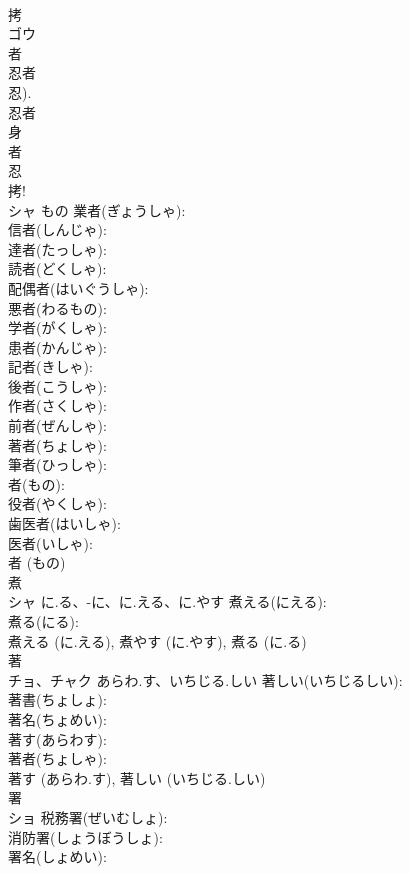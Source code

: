 \documentclass[8pt]{extreport}
\begin{document}
\begin{CJK}{UTF8}{min}
\\	拷			
\\	ゴウ			
\\	者			
\\	忍者 
\\	忍). 
\\	忍者 
\\	身 
\\	者 
\\	忍 
\\	拷!	
\\	シャ	もの	業者(ぎょうしゃ): 
\\	信者(しんじゃ): 
\\	達者(たっしゃ): 
\\	読者(どくしゃ): 
\\	配偶者(はいぐうしゃ): 
\\	悪者(わるもの): 
\\	学者(がくしゃ): 
\\	患者(かんじゃ): 
\\	記者(きしゃ): 
\\	後者(こうしゃ): 
\\	作者(さくしゃ): 
\\	前者(ぜんしゃ): 
\\	著者(ちょしゃ): 
\\	筆者(ひっしゃ): 
\\	者(もの): 
\\	役者(やくしゃ): 
\\	歯医者(はいしゃ): 
\\	医者(いしゃ): 
\\	者 (もの)
\\	煮			
\\	シャ	に.る、-に、に.える、に.やす	煮える(にえる): 
\\	煮る(にる): 
\\	煮える (に.える), 煮やす (に.やす), 煮る (に.る)
\\	著			
\\	チョ、チャク	あらわ.す、いちじる.しい	著しい(いちじるしい): 
\\	著書(ちょしょ): 
\\	著名(ちょめい): 
\\	著す(あらわす): 
\\	著者(ちょしゃ): 
\\	著す (あらわ.す), 著しい (いちじる.しい)
\\	署			
\\	ショ		税務署(ぜいむしょ): 
\\	消防署(しょうぼうしょ): 
\\	署名(しょめい): 

\end{CJK}
\end{document}
